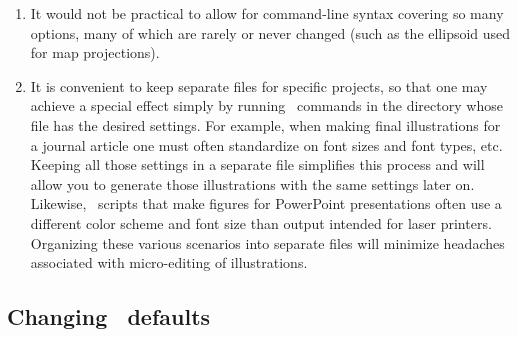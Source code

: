 \begin{enumerate}

\item It would not be practical to allow for command-line syntax
covering so many options, many of which are rarely or never
changed (such as the ellipsoid used for map projections).

\item It is convenient to keep separate 
files for specific projects, so that one may achieve a special
effect simply by running \GMT\ commands in the directory whose
 file has the desired settings.  For example,
when making final illustrations for a journal article one must often
standardize on font sizes and font types, etc.  Keeping all those
settings in a separate  file simplifies this
process and will allow you to generate those illustrations with the same settings later on.  Likewise, \GMT\ scripts that make figures for PowerPoint
presentations often use a different color scheme and font size than
output intended for laser printers.  Organizing these various scenarios
into separate  files will minimize headaches
associated with micro-editing of illustrations.


\end{enumerate}

\subsection{Changing \gmt\ defaults}

